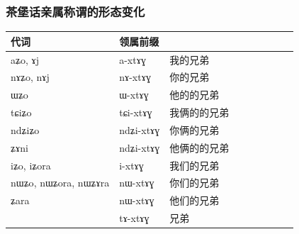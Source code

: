 \documentclass[xcolor=table]{beamer}
\newcommand{\ipa}[1]{{\phon #1}} %
\newcommand{\zh}[1]{{\cn #1}}
\begin{document}
%   
%   
%    
%
%
%


  \begin{frame} 
 \frametitle{\zh{茶堡话亲属称谓的形态变化}} 
 

\begin{tabular}{lllllllll} \toprule
 \zh{代词} & \zh{领属前缀} & \\
\midrule
 \ipa{aʑo},    \ipa{ɤj} &	\ipa{a-xtɤɣ}  &	 \zh{我的兄弟} \\
\ipa{nɤʑo},  \ipa{nɤj} &	\ipa{nɤ-xtɤɣ}  & \zh{你的兄弟} \\
\ipa{ɯʑo}  &	\ipa{ɯ-xtɤɣ}  &		 \zh{他的的兄弟} \\
\ipa{tɕiʑo}  &	\ipa{tɕi-xtɤɣ}  &	 \zh{我俩的的兄弟} \\
\ipa{ndʑiʑo}  &	\ipa{ndʑi-xtɤɣ}  &	 \zh{你俩的兄弟} \\	
\ipa{ʑɤni}  &	\ipa{ndʑi-xtɤɣ}  &	 \zh{他俩的的兄弟} \\	
\ipa{iʑo}, \ipa{iʑora}      &	\ipa{i-xtɤɣ}  &			 \zh{我们的兄弟} \\
\ipa{nɯʑo}, \ipa{nɯʑora},   \ipa{nɯʑɤra}  &	\ipa{nɯ-xtɤɣ}  &			 \zh{你们的兄弟} \\
\ipa{ʑara}  &	\ipa{nɯ-xtɤɣ}  &	 \zh{他们的兄弟} \\
   &	\ipa{tɤ-xtɤɣ}  &	 \zh{兄弟} \\
\bottomrule
\end{tabular}

\end{frame}
\end{document}
